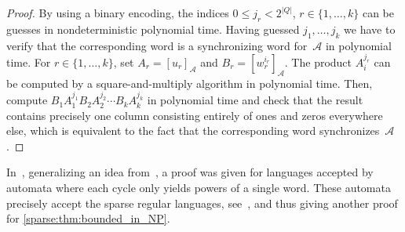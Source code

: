 \begin{proof}
	By using a binary encoding, the indices $0 \le j_r < 2^{|Q|}$, $r \in \{1,\ldots,k\}$
	can be guesses in nondeterministic
	polynomial time.
	Having guessed $j_1,\ldots, j_k$ we have to verify that the corresponding word %
	is a synchronizing word for~$\mathcal A$ in 
	polynomial time.
	For $r \in \{1,\ldots,k\}$, 
	set $A_r = [u_r]_{\mathcal A}$ and $B_r = [w_r^{i_r}]_{\mathcal A}$.
	The product $A_i^{j_r}$  
	can be computed by a square-and-multiply
	algorithm in polynomial time.
	Then, compute $B_1 A_1^{j_1} B_2 A_2^{j_2} \cdots B_k A_k^{j_k}$ in polynomial time and check that the result 
	contains precisely one column
	consisting entirely of ones and zeros everywhere else, which
	is equivalent to the fact that the corresponding word 
	synchronizes~$\mathcal A$.
\end{proof}

In~\cite[Thm.~2]{DBLP:conf/ictcs/Hoffman20}, generalizing
an idea from~\cite[Thm.~19]{FernauGHHVW19},
a proof was given for languages accepted
by automata where each cycle only yields powers of a single word.
These automata precisely accept the sparse regular languages,
see~\cite[Thm.~XII.4.29]{Pin2022}, and thus giving
another proof for \cref{sparse:thm:bounded_in_NP}.

